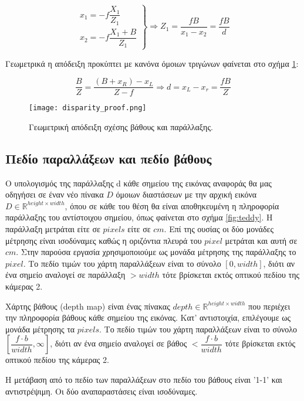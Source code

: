 \begin{equation} \label{eq:disp2depth}
	\left. 
		\begin{matrix}
			x_1 = -f\dfrac{X_1}{Z_1} \\
			x_2 = -f\dfrac{X_1 + B}{Z_1}
		\end{matrix}
	\right\} \Rightarrow
	Z_1 = \dfrac{fB}{x_1-x_2} = \dfrac{fB}{d}
\end{equation}

Γεωμετρικά η απόδειξη προκύπτει με κανόνα όμοιων τριγώνων φαίνεται στο σχήμα \ref{fig:disparity_proof}:

$$\dfrac{B}{Z} = \dfrac{(B+x_R)-x_L}{Z-f} \Rightarrow d = x_L - x_r = \dfrac{fB}{Z}$$

\begin{figure}
	\centering
	\texttt{[image: disparity\_proof.png]}
	\caption{Γεωμετρική απόδειξη σχέσης βάθους και παράλλαξης.}
	\label{fig:disparity_proof}
\end{figure}



\subsection{Πεδίο παραλλάξεων και πεδίο βάθους}

Ο υπολογισμός της παράλλαξης \e d \g κάθε σημείου της εικόνας αναφοράς θα μας οδηγήσει σε έναν νέο πίνακα $D$ όμοιων διαστάσεων με την αρχική εικόνα $D \in \mathbb{R}^{height \times width}$, όπου σε κάθε του θέση θα είναι αποθηκευμένη η πληροφορία παράλλαξης του αντίστοιχου σημείου, όπως φαίνεται στο σχήμα \ref{fig:teddy}. Η παράλλαξη μετράται είτε σε $pixels$ είτε σε $cm$. Επί της ουσίας οι δύο μονάδες μέτρησης είναι ισοδύναμες καθώς η οριζόντια πλευρά του $pixel$ μετράται και αυτή σε $cm$. Στην παρούσα εργασία χρησιμοποιούμε ως μονάδα μέτρησης της παράλλαξης το $pixel$. Το πεδίο τιμών του χάρτη παραλλάξεων είναι το σύνολο $[0,width]$, διότι αν ένα σημείο αναλογεί σε παράλλαξη $> width$ τότε βρίσκεται εκτός οπτικού πεδίου της κάμερας 2.

Χάρτης βάθους \e (depth map) \g είναι ένας πίνακας $depth \in \mathbb{R}^{height \times width}$ που περιέχει την πληροφορία βάθους κάθε σημείου της εικόνας. Κατ' αντιστοιχία, επιλέγουμε ως μονάδα μέτρησης τα $pixels$. Το πεδίο τιμών του χάρτη παραλλάξεων είναι το σύνολο $[\dfrac{f\cdot b}{width},\infty]$, διότι αν ένα σημείο αναλογεί σε βάθος $< \dfrac{f\cdot b}{width}$ τότε βρίσκεται εκτός οπτικού πεδίου της κάμερας 2.

Η μετάβαση από το πεδίο των παραλλάξεων στο πεδίο του βάθους είναι '1-1' και αντιστρέψιμη. Οι δύο αναπαραστάσεις είναι ισοδύναμες.

